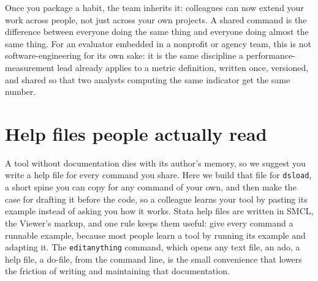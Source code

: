 Once you package a habit, the team inherits it: colleagues can now extend your work across people, not just across your own projects. A shared command is the difference between everyone doing the same thing and everyone doing almost the same thing. For an evaluator embedded in a nonprofit or agency team, this is not software-engineering for its own sake: it is the same discipline a performance-measurement lead already applies to a metric definition, written once, versioned, and shared so that two analysts computing the same indicator get the same number.

\section{Help files people actually read}
A tool without documentation dies with its author's memory, so we suggest you write a help file for every command you share. Here we build that file for \texttt{dsload}, a short spine you can copy for any command of your own, and then make the case for drafting it before the code, so a colleague learns your tool by pasting its example instead of asking you how it works. Stata help files are written in SMCL, the Viewer's markup, and one rule keeps them useful: give every command a runnable example, because most people learn a tool by running its example and adapting it. The \texttt{editanything} command, which opens any text file, an ado, a help file, a do-file, from the command line, is the small convenience that lowers the friction of writing and maintaining that documentation.

